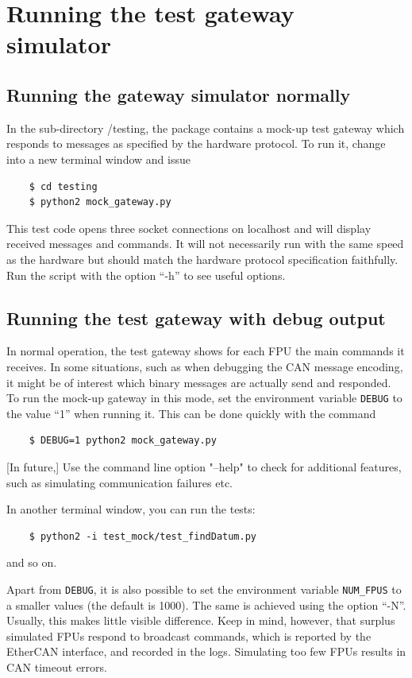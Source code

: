\documentclass[11pt,a4paper]{report}
\begin{document}
\section{Running the test gateway simulator}
\label{sec:runningthegateway}
\subsection{Running the gateway simulator normally}
In the sub-directory /testing, the package contains a mock-up test
gateway which responds to messages as specified by the hardware
protocol. To run it, change into a new terminal window and
issue

  \begin{verbatim}
    $ cd testing
    $ python2 mock_gateway.py
  \end{verbatim}    


This test code opens three socket connections on localhost and will
display received messages and commands. It will not necessarily run
with the same speed as the hardware but should match the hardware
protocol specification faithfully. Run the script with the option
``-h'' to see useful options.

\subsection{Running the test gateway with debug output}

In normal operation, the test gateway shows for each FPU the main
commands it receives. In some situations, such as when debugging the
CAN message encoding, it might be of interest which binary messages
are actually send and responded. To run the mock-up gateway in this
mode, set the environment variable \texttt{DEBUG} to the value ``1''
when running it. This can be done quickly with the command

  \begin{verbatim}
    $ DEBUG=1 python2 mock_gateway.py
  \end{verbatim}    



[In future,] Use the command line option "--help" to check for additional features,
such as simulating communication failures etc.

In another terminal window, you can run the tests:
  \begin{verbatim}
    $ python2 -i test_mock/test_findDatum.py
  \end{verbatim}    
and so on.

Apart from \texttt{DEBUG}, it is also possible to set the environment
variable \texttt{NUM\_FPUS} to a smaller values (the default is 1000).
The same is achieved using the option ``-N''.  Usually, this makes
little visible difference. Keep in mind, however, that surplus
simulated FPUs respond to broadcast commands, which is reported by the
EtherCAN interface, and recorded in the logs. Simulating too few FPUs results in
CAN timeout errors.

\printindex
\end{document}
